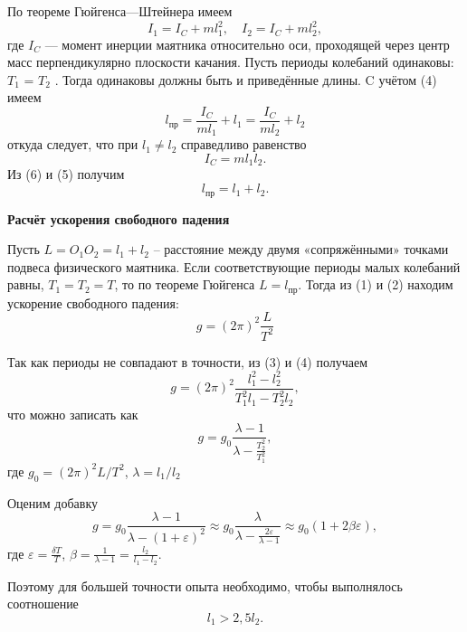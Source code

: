 \documentclass[a4paper,12 pt]{article}
\begin{document}
По теореме Гюйгенса—Штейнера имеем
\begin{equation}
    I_1=I_C + ml_1^2, \quad I_2=I_C + ml_2^2,
\end{equation}
где $I_C$ — момент инерции маятника относительно оси, проходящей через
центр масс перпендикулярно плоскости качания.
Пусть периоды колебаний одинаковы: $T_1$ = $T_2$ . Тогда одинаковы
должны быть и приведённые длины. C учётом (4) имеем
\begin{equation}
    l_{\text{пр}} = \frac{I_C}{ml_1} + l_1 = \frac{I_C}{ml_2} + l_2
\end{equation}
откуда следует, что при $l_1 \neq l_2$ справедливо равенство
\begin{equation}
    I_C = ml_1 l_2.
\end{equation}
Из (6) и (5) получим
\begin{equation}
    l_{\text{пр}} = l_1 + l_2.
\end{equation}

\textbf{Расчёт ускорения свободного падения}

Пусть $L = O_1 O_2 = l_1+l_2$ -- расстояние между двумя «сопряжёнными»
точками подвеса физического маятника. Если соответствующие периоды
малых колебаний равны, $T_1=T_2=T$, то по теореме Гюйгенса $L=l_{\text{пр}}$. Тогда из (1) и (2) находим ускорение свободного падения:
\begin{equation}
    g = (2\pi)^2 \frac{L}{T^2}
\end{equation}

Так как периоды не совпадают в точности, из (3) и (4) получаем
\begin{equation}
    g = (2\pi)^2 \frac{l_1^2-l_2^2}{T_1^2l_1-T_2^2l_2},
\end{equation}
что можно записать как
\begin{equation}
    g = g_0 \frac{\lambda-1}{\lambda - \frac{T_2^2}{T_1^2}},
\end{equation}
где $g_0 = (2 \pi)^2 L/T^2$, $\lambda=l_1/l_2$

Оценим добавку
\begin{displaymath}
    g = g_0 \frac{\lambda-1}{\lambda-(1+\varepsilon)^2} \approx g_0 \frac{\lambda}{\lambda-\frac{2\varepsilon}{\lambda-1}} \approx g_0 (1+2\beta \varepsilon),
\end{displaymath}
где $\varepsilon = \frac{\delta T}{T}$, $\beta = \frac{1}{\lambda-1} = \frac{l_2}{l_1-l_2}$.

Поэтому для большей точности опыта необходимо, чтобы выполнялось соотношение
\begin{displaymath}
    l_1>2,5l_2.
\end{displaymath}
\end{document}
